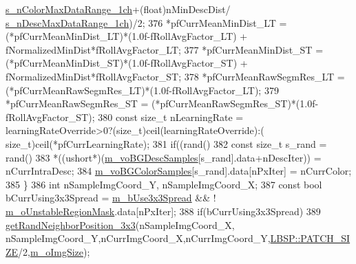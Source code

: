 \begin{DoxyCode}
      \mbox{\hyperlink{_background_subtractor_su_b_s_e_n_s_e_8cpp_ad0ce3de05453a1b3738f711d9955031f}{s\_nColorMaxDataRange\_1ch}}+(\textcolor{keywordtype}{float})nMinDescDist/
      \mbox{\hyperlink{_background_subtractor_su_b_s_e_n_s_e_8cpp_a15305d6ff106cc0ab9f1b7cfb21a27c7}{s\_nDescMaxDataRange\_1ch}})/2;
376                 *pfCurrMeanMinDist\_LT = (*pfCurrMeanMinDist\_LT)*(1.0f-fRollAvgFactor\_LT) + 
      fNormalizedMinDist*fRollAvgFactor\_LT;
377                 *pfCurrMeanMinDist\_ST = (*pfCurrMeanMinDist\_ST)*(1.0f-fRollAvgFactor\_ST) + 
      fNormalizedMinDist*fRollAvgFactor\_ST;
378                 *pfCurrMeanRawSegmRes\_LT = (*pfCurrMeanRawSegmRes\_LT)*(1.0f-fRollAvgFactor\_LT);
379                 *pfCurrMeanRawSegmRes\_ST = (*pfCurrMeanRawSegmRes\_ST)*(1.0f-fRollAvgFactor\_ST);
380                 \textcolor{keyword}{const} \textcolor{keywordtype}{size\_t} nLearningRate = learningRateOverride>0?(size\_t)ceil(learningRateOverride):(
      size\_t)ceil(*pfCurrLearningRate);
381                 \textcolor{keywordflow}{if}((rand()%
382                     \textcolor{keyword}{const} \textcolor{keywordtype}{size\_t} s\_rand = rand()%
383                     *((ushort*)(\mbox{\hyperlink{class_background_subtractor_su_b_s_e_n_s_e_a422cc2f2a25c07efca02087bd6fe3d6d}{m\_voBGDescSamples}}[s\_rand].data+nDescIter)) = 
      nCurrIntraDesc;
384                     \mbox{\hyperlink{class_background_subtractor_su_b_s_e_n_s_e_a9d4d4bb930b34745536b9862683bb539}{m\_voBGColorSamples}}[s\_rand].data[nPxIter] = nCurrColor;
385                 \}
386                 \textcolor{keywordtype}{int} nSampleImgCoord\_Y, nSampleImgCoord\_X;
387                 \textcolor{keyword}{const} \textcolor{keywordtype}{bool} bCurrUsing3x3Spread = \mbox{\hyperlink{class_background_subtractor_su_b_s_e_n_s_e_a1e2e28840e7ca373282607db81b49e12}{m\_bUse3x3Spread}} && !
      \mbox{\hyperlink{class_background_subtractor_su_b_s_e_n_s_e_acfaf4c3c5aedbed8bd302444b4a4f8dd}{m\_oUnstableRegionMask}}.data[nPxIter];
388                 \textcolor{keywordflow}{if}(bCurrUsing3x3Spread)
389                     \mbox{\hyperlink{_rand_utils_8h_a76b18bef397ed044a6db9e3a63c69f69}{getRandNeighborPosition\_3x3}}(nSampleImgCoord\_X,
      nSampleImgCoord\_Y,nCurrImgCoord\_X,nCurrImgCoord\_Y,\mbox{\hyperlink{class_l_b_s_p_aa98abb79a155d3a2b416c2ab32e74929}{LBSP::PATCH\_SIZE}}/2,\mbox{\hyperlink{class_background_subtractor_l_b_s_p_a732d5e6ae35fb0e858cadb3af5ce08a2}{m\_oImgSize}});

\end{DoxyCode}
